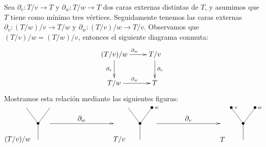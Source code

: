 \documentclass[../main.tex]{subfiles}
\begin{document}
Sea $\partial_v \colon T/v\to T$ y $\partial_w \colon T/w\to T$ dos caras externas distintas de $T$, y asumimos que $T$ tiene como m\'inimo tres v\'ertices.
Seguidamente tenemos las caras externas $\partial_v \colon (T/w)/v \to T/w$ y $\partial_w \colon (T/v)/w \to T/v$. Observamos que $(T/v)/w = (T/w)/v$, entonces el siguiente diagrama conmuta:
$$
    \xymatrix{
        (T/v)/w \ar[d]_{\partial_v} \ar[r]^{\partial_w}
        &T/v \ar[d]^{\partial_v} \\
        T/w \ar[r]^{\partial_w}
        &T
    }
$$
Mostramos esta relaci\'on mediante las siguientes figuras:
\begin{equation}
    \xy
    <0.08cm, 0cm>:
    (0.0, 0.0)*{}="1"; %
    (0.0, 10.0)*=0{\bullet}="2"; %
    (-7.5, 20.0)*{}="3"; %
    (7.5, 20.0)*{}="4"; %
    "1";"2" **\dir{-};
    "2";"3" **\dir{-};
    "2";"4" **\dir{-};
    (-13,0)*{(T/v)/w};
    \endxy
    \xy
    <0.08cm, 0cm>:
    (-20, 0.0)*{}="1";
    (20, 0.0)*{}="2";
    (20, 10)*{}="3";
    (-20, 0)*{}="4";
    {\ar(-20, 10)*{};(20,10)*{}};
    (0,13)*{\partial_w};
    \endxy
    \xy
    <0.08cm, 0cm>:
    (0.0, 0.0)*{}="1"; %
    (0.0, 10.0)*=0{\bullet}="2"; %
    (-7.5, 20.0)*{}="3"; %
    (7.5, 20.0)*=0{\bullet}="4"; %
    "1";"2" **\dir{-};
    "2";"3" **\dir{-};
    "2";"4" **\dir{-};
    (10.5, 20.0)*=0{\scriptstyle w};
    (-13,0)*{T/v};
    \endxy
    \xy
    <0.08cm, 0cm>:
    (-20, 0.0)*{}="1";
    (20, 0.0)*{}="2";
    (20, 10)*{}="3";
    (-20, 0)*{}="4";
    {\ar(-20, 10)*{};(20,10)*{}};
    (0,13)*{\partial_v};
    \endxy
    \xy
    <0.08cm, 0cm>:
    (0.0, 0.0)*{}="1"; %
    (0.0, 10.0)*=0{\bullet}="2"; %
    (-7.5, 20.0)*=0{\bullet}="3"; %
    (7.5, 20.0)*=0{\bullet}="4"; %
    "1";"2" **\dir{-};
    "2";"3" **\dir{-};
    "2";"4" **\dir{-};
    (-4.5, 20.0)*=0{\scriptstyle v};
    (10.5, 20.0)*=0{\scriptstyle w};
    (-13,0)*{T};
    \endxy
\end{equation}
\end{document}
